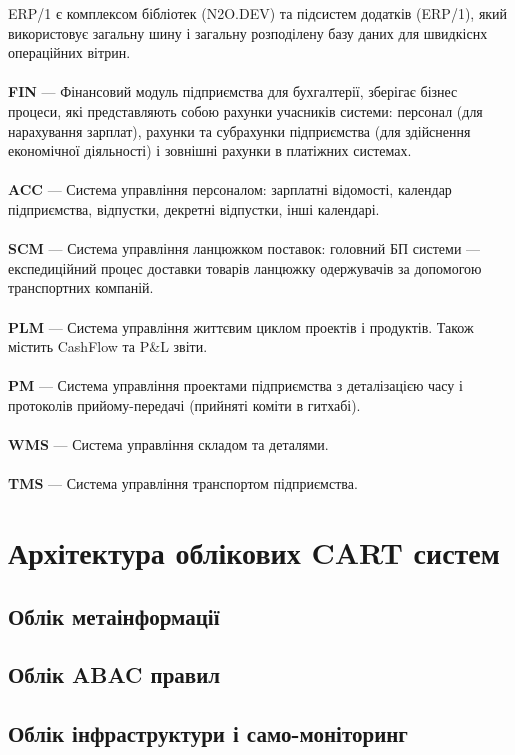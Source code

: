 ERP/1 є комплексом бібліотек (N2O.DEV) та підсистем додатків (ERP/1),
який використовує загальну шину і загальну розподілену базу даних для швидкіснх операційних вітрин.
\\
\\
\textbf{FIN} — Фінансовий модуль підприємства для бухгалтерії, зберігає бізнес процеси,
        які представляють собою рахунки учасників системи: персонал (для нарахування зарплат),
        рахунки та субрахунки підприємства (для здійснення економічної діяльності) і
        зовнішні рахунки в платіжних системах.
\\
\\
\textbf{ACC} — Система управління персоналом: зарплатні відомості,
        календар підприємства, відпустки, декретні відпустки, інші календарі.
\\
\\
\textbf{SCM} — Система управління ланцюжком поставок: головний БП системи —
           експедиційний процес доставки товарів ланцюжку одержувачів
           за допомогою транспортних компаній.
\\
\\
\textbf{PLM} — Система управління життєвим циклом проектів і продуктів.
           Також містить CashFlow та P\&L звіти.
\\
\\
\textbf{PM} — Система управління проектами підприємства з деталізацією
           часу і протоколів прийому-передачі (прийняті коміти в гитхабі).
\\
\\
\textbf{WMS} — Система управління складом та деталями.
\\
\\
\textbf{TMS} — Система управління транспортом підприємства.

\section{Архітектура облікових CART систем}

\subsection{Облік метаінформації}

\subsection{Облік ABAC правил}

\subsection{Облік інфраструктури і само-моніторинг}

